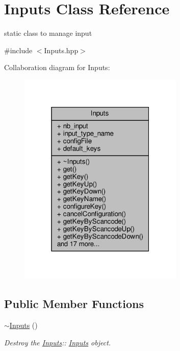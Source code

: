 \hypertarget{class_inputs}{}\section{Inputs Class Reference}
\label{class_inputs}


static class to manage input  




{\ttfamily \#include $<$Inputs.\+hpp$>$}



Collaboration diagram for Inputs\+:
\nopagebreak
\begin{figure}[H]
\begin{center}
\leavevmode
\includegraphics[width=223pt]{class_inputs__coll__graph}
\end{center}
\end{figure}
\subsection*{Public Member Functions}
\begin{DoxyCompactItemize}
\item 
\mbox{\label{class_inputs_a721935d4549a704e944c056227214ca5}} 
\hyperlink{class_inputs_a721935d4549a704e944c056227214ca5}{$\sim$\+Inputs} ()
\begin{DoxyCompactList}\small\item\em Destroy the \hyperlink{class_inputs}{Inputs}\+:\+: \hyperlink{class_inputs}{Inputs} object. \end{DoxyCompactList}\end{DoxyCompactItemize}
